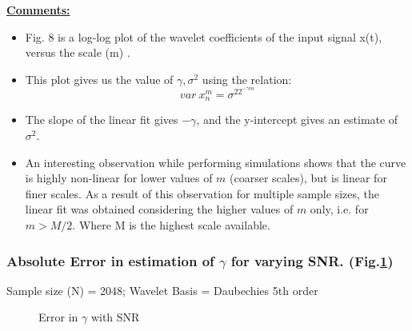 \documentclass[a4paper]{article}
\begin{document}
\underline{\textbf{Comments:}}
\begin{itemize}
\item Fig. 8 is a log-log plot of the wavelet coefficients of the input signal x(t), versus the scale (m) .
\item This plot gives us the value of $\gamma, \sigma^2 $ using the relation:
$$var\ x_n^m = \sigma^22^{-\gamma m}$$
\item The slope of the linear fit gives $-\gamma$, and the y-intercept gives an estimate of $\sigma^2 $.
\item An interesting observation while performing simulations shows that the curve is highly non-linear for lower values of $m$ (coarser scales), but is linear for finer scales. As a result of this observation for multiple sample sizes, the linear fit was obtained considering the higher values of $m$ only, i.e. for $m > M/2$. Where M is the highest scale available.

\end{itemize}
\subsubsection{Absolute Error in estimation of $\gamma$ for varying SNR. (Fig.\ref{fig:gamma_snr})}
Sample size (N) = 2048; Wavelet Basis = Daubechies 5th order

\begin{figure}[h]
    \centering
   \qquad
    \caption{Error in $\gamma$ with SNR}%
    \label{fig:gamma_snr}%
\end{figure}
\end{document}
